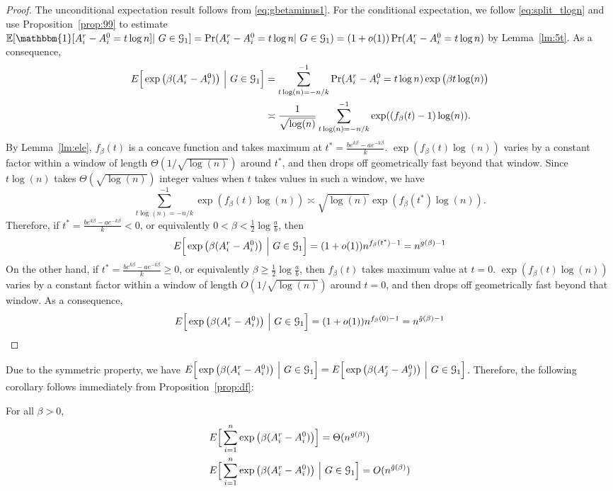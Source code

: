 \documentclass{article}
\begin{document}
\begin{proof}
The unconditional expectation result follows from \eqref{eq:gbetaminus1}.
For the conditional expectation, we follow \eqref{eq:split_tlogn} and use Proposition~\ref{prop:99} to estimate
$\mathbb{E}[\mathbbm{1}[A^r_i - A^0_i = t \log n]|~G\in\cG_1] = \Pr(A^r_i - A^0_i = t \log n|~G\in\cG_1) = (1+o(1))\Pr(A^r_i - A^0_i = t \log n)$
by Lemma~\ref{lm:5t}.
As a consequence,
\begin{equation}  \label{eq:wf1}
\begin{aligned}
E \Big[\exp\big(\beta (A^r_i-A^0_i) \big) ~\Big|~ G\in\mathcal{G}_1 \Big]
& =  \sum_{t\log(n)=-n/k}^{-1}
\Pr(A^r_i - A^0_i = t \log n)\exp\big(\beta t \log(n) \big)  \\
& \asymp  \frac{1} {\sqrt{\log(n)}} \sum_{t\log(n)=-n/k}^{-1}
 \exp( (f_{\beta}(t) -1)\log(n) ) .
\end{aligned}
\end{equation}
By Lemma~\ref{lm:ele}, $f_{\beta}(t)$ is a concave function and takes maximum at
$t^\ast=\frac{b e^{k\beta}-a e^{-k\beta}}{k}$. 
$\exp( f_{\beta}(t) \log(n))$ varies by a constant factor within a window of length $\Theta(1/\sqrt{\log(n)})$ around $t^\ast$, and
then drops off geometrically fast beyond that window. Since $t\log(n)$ takes $\Theta(\sqrt{\log(n)})$ integer values when $t$ takes values in such a window, we have
\begin{equation} \label{eq:wf2}
\sum_{t\log(n)=-n/k}^{-1}
 \exp( f_{\beta}(t) \log(n) )
 \asymp \sqrt{\log(n)}
 \exp( f_{\beta}(t^\ast) \log(n) ) .
\end{equation}
Therefore, if $t^\ast=\frac{b e^{k\beta}-a e^{-k\beta}}{k}<0$,
or equivalently $0<\beta<\frac{1}{2}\log\frac{a}{b}$, then
$$
E \Big[\exp\big(\beta (A^r_i-A^0_i) \big) ~\Big|~ G\in\mathcal{G}_1 \Big] = (1+o(1))
n^{f_{\beta}(t^*)-1} = n^{g(\beta)-1}
$$
On the other hand,
if $t^\ast=\frac{b e^{k\beta}-a e^{-k\beta}}{k}\ge 0$, or equivalently $\beta\ge\frac{1}{2}\log\frac{a}{b}$, then
$f_{\beta}(t)$ takes maximum value at $t=0$.
$\exp( f_{\beta}(t) \log(n))$ varies by a constant factor within a window of length $O(1/\sqrt{\log(n)})$ around $t=0$, and
then drops off geometrically fast beyond that window. As a consequence,
\begin{align*}
E \Big[\exp\big(\beta (A^r_i-A^0_i) \big) ~\Big|~ G\in\mathcal{G}_1 \Big] = (1+o(1))
n^{f_{\beta}(0)-1} = n^{\tilde{g}(\beta)-1}
\end{align*}
\end{proof}
Due to the symmetric property, we have
$E \Big[\exp\big(\beta (A^r_i-A^0_i) \big) ~\Big|~ G\in\mathcal{G}_1 \Big] = E \Big[\exp\big(\beta (A^r_j-A^0_j) \big) ~\Big|~ G\in\mathcal{G}_1 \Big]$.
Therefore, the following corollary follows immediately from Proposition~\ref{prop:df}:
\begin{corollary} \label{cr:yy}
For all $\beta>0$,
\begin{align}
& E \Big[ \sum_{i=1}^n  \exp\big(\beta (A^r_i-A^0_i) \big)  \Big] 
= \Theta(n^{g(\beta)}) \label{eq:ThetaEbeta} \\
& E \Big[ \sum_{i=1}^n  \exp\big(\beta (A^r_i-A^0_i) \big) ~\Big|~ G\in\mathcal{G}_1 \Big] 
= O(n^{\tilde{g}(\beta)})
\end{align}
\end{corollary}
\end{document}
